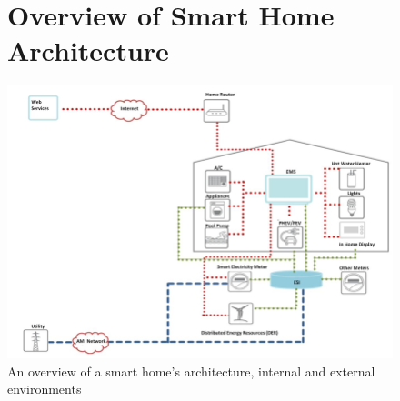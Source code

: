 \cleardoublepage

\begin{appendices}

    \begin{figure}[ht!]
        \section{Overview of Smart Home Architecture \cite{komninosEtAl2014}}
        \label{sec:overview-of-smart-home-architecture}
        \includegraphics[width=\linewidth]{datasets/images/A1}
        \caption{An overview of a smart home's architecture, internal and external environments}
        \label{fig:figure4}
        \cleardoublepage
    \end{figure}

    \begin{figure}[ht!]

\end{figure}
\end{appendices}
